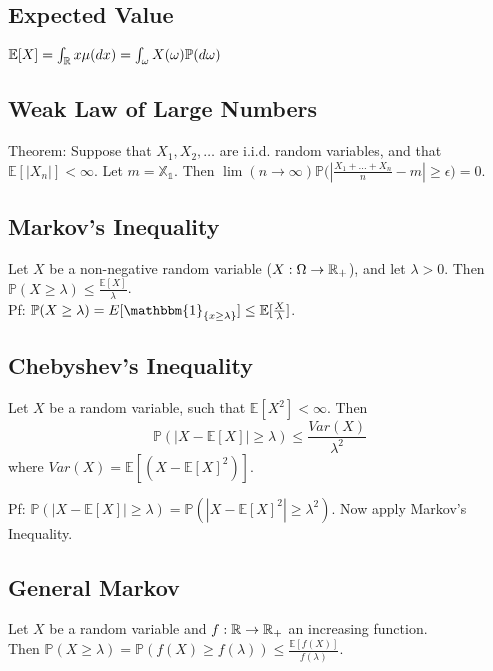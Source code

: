 \documentclass[english, 11pt]{article}
\begin{document}
\subsection{Expected Value}

$\mathbb{E}[X] = \int_{\mathbb{R}} x \mu(dx) = \int_\omega X(\omega) \mathbb{P}(d\omega)$

\subsection{Weak Law of Large Numbers}

Theorem: Suppose that $X_1, X_2, \dots$ are i.i.d. random variables, and that $\mathbb{E}[|X_n|] < \infty$. Let $m = \mathbb{X_1}$. Then $\lim(n \to \infty)\mathbb{P}\Big(|\frac{X_1 + \dots + X_n}{n} - m| \geq \epsilon \Big) = 0$.\\

\subsection{Markov's Inequality}
Let $X$ be a non-negative random variable ($X: \Omega \to {\mathbb{R}}_+$), and let $\lambda > 0$. Then $\mathbb{P}(X \geq \lambda) \leq \frac{\mathbb{E}[X]}{\lambda}$.\\

Pf: $\mathbb{P}(X \geq \lambda) = E[\mathbbm{1}_{\{x \geq \lambda\}}] \leq \mathbb{E}[\frac{X}{\lambda}]$.

\subsection{Chebyshev's Inequality}

Let $X$ be a random variable, such that $\mathbb{E}[X^2] < \infty$. Then
\[\mathbb{P}(|X - \mathbb{E}[X]| \geq \lambda)\leq \frac{Var(X)}{\lambda^2} \]
where $Var(X) = \mathbb{E}[(X - \mathbb{E}[X]^2)]$.

Pf: $\mathbb{P}(|X - \mathbb{E}[X]| \geq \lambda) = \mathbb{P}(|X - \mathbb{E}[X]^2| \geq \lambda^2)$. Now apply Markov's Inequality.\\

\subsection{General Markov}
Let $X$ be a random variable and $f: {\mathbb{R}} \to {\mathbb{R}}_+$ an increasing function.\\

Then $\mathbb{P}(X \geq \lambda) = \mathbb{P}(f(X) \geq f(\lambda)) \leq \frac{\mathbb{E}[f(X)]}{f(\lambda)}$.\\
\end{document}

